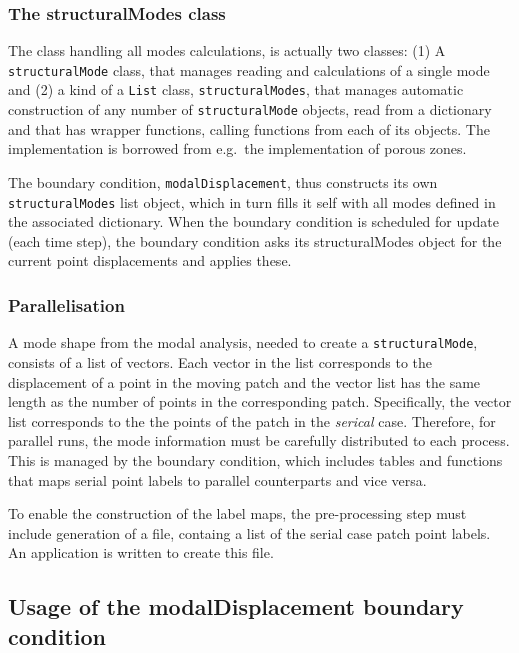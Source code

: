 \subsubsection{The structuralModes class}

The class handling all modes calculations, is actually two classes: (1) A
\texttt{structuralMode} class, that manages reading and calculations of a
single mode and (2) a kind of a \texttt{List} class, \texttt{structuralModes},
that manages automatic construction of any number of \texttt{structuralMode}
objects, read from a dictionary and that has wrapper functions, calling
functions from each of its objects.  The implementation is borrowed from
e.g.~the implementation of porous zones.

The boundary condition, \texttt{modalDisplacement}, thus constructs its own
\texttt{structuralModes} list object, which in turn fills it self with all modes
defined in the associated dictionary. When the boundary condition is scheduled for
update (each time step), the boundary condition asks its structuralModes object
for the current point displacements and applies these.

\subsubsection{Parallelisation}

A mode shape from the modal analysis, needed to create a
\texttt{structuralMode}, consists of a list of vectors. Each vector in the list
corresponds to the displacement of a point in the moving patch and the vector list
has the same length as the number of points in the corresponding patch.
Specifically, the vector list corresponds to the the points of the patch in the
\emph{serical} case. Therefore, for parallel runs, the mode information must be
carefully distributed to each process. This is managed by the boundary condition,
which includes tables and functions that maps serial point labels to parallel
counterparts and vice versa.

To enable the construction of the label maps, the pre-processing step must include
generation of a file, containg a list of the serial case patch point labels.
An application is written to create this file.



\subsection{Usage of the modalDisplacement boundary condition}

